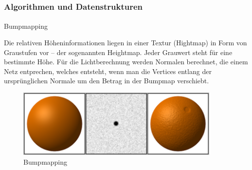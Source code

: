 \documentclass{beamer}
\begin{document}
\begin{frame}
    \frametitle{Algorithmen und Datenstrukturen}
\framesubtitle{}
    \begin{block}{Bumpmapping}

        Die relativen Höheninformationen liegen in einer Textur (Hightmap) in Form von Graustufen vor – der sogenannten Heightmap. 
        Jeder Grauwert steht für eine bestimmte Höhe. 
        Für die Lichtberechnung werden Normalen berechnet, 
        die einem Netz entprechen,
        welches entsteht, wenn man die Vertices entlang der ursprünglichen Normale um den Betrag in der Bumpmap verschiebt.  
        
        \begin{figure}[H]
            \centering
            \includegraphics[width=0.9\textwidth]{images/Bumpmap.png}
            \caption{Bumpmapping} %
        \end{figure}
        
\end{block}

\end{frame}
\end{document}

